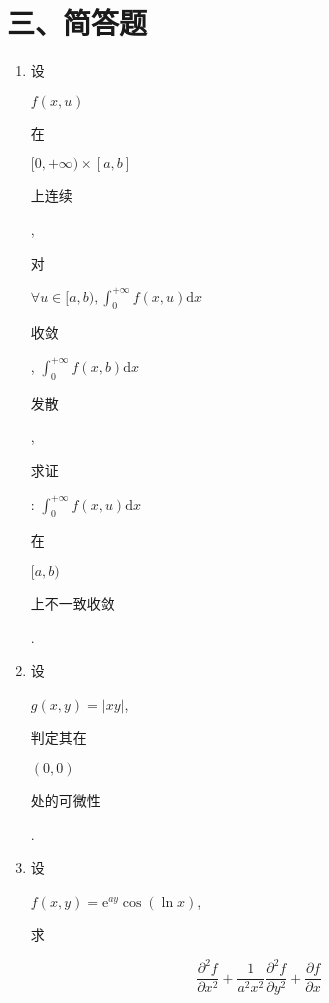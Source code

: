 \documentclass[10pt]{article}
\begin{document}
\section{三、简答题}
\begin{enumerate}
  \item \begin{CJK}{UTF8}{mj}设\end{CJK} $f(x, u)$ \begin{CJK}{UTF8}{mj}在\end{CJK} $[0,+\infty) \times[a, b]$ \begin{CJK}{UTF8}{mj}上连续\end{CJK}, \begin{CJK}{UTF8}{mj}对\end{CJK} $\forall u \in[a, b), \int_{0}^{+\infty} f(x, u) \mathrm{d} x$ \begin{CJK}{UTF8}{mj}收敛\end{CJK}, $\int_{0}^{+\infty} f(x, b) \mathrm{d} x$ \begin{CJK}{UTF8}{mj}发散\end{CJK}, \begin{CJK}{UTF8}{mj}求证\end{CJK}: $\int_{0}^{+\infty} f(x, u) \mathrm{d} x$ \begin{CJK}{UTF8}{mj}在\end{CJK} $[a, b)$ \begin{CJK}{UTF8}{mj}上不一致收敛\end{CJK}.

  \item \begin{CJK}{UTF8}{mj}设\end{CJK} $g(x, y)=|x y|$, \begin{CJK}{UTF8}{mj}判定其在\end{CJK} $(0,0)$ \begin{CJK}{UTF8}{mj}处的可微性\end{CJK}.

  \item \begin{CJK}{UTF8}{mj}设\end{CJK} $f(x, y)=\mathrm{e}^{a y} \cos (\ln x)$, \begin{CJK}{UTF8}{mj}求\end{CJK}

\end{enumerate}
$$
\frac{\partial^{2} f}{\partial x^{2}}+\frac{1}{a^{2} x^{2}} \frac{\partial^{2} f}{\partial y^{2}}+\frac{\partial f}{\partial x}
$$
\end{document}
